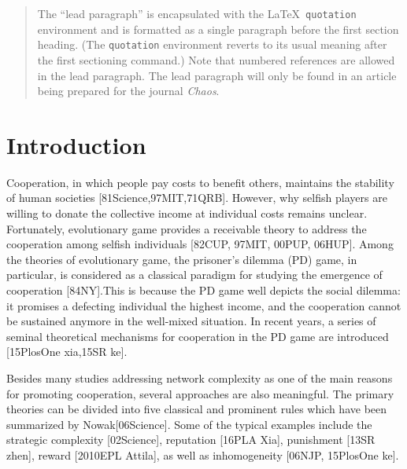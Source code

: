 \documentclass[%
 aip,
 amsmath,amssymb,
 reprint,%
]{revtex4-1}
\begin{document}
\maketitle

\begin{quotation}
The ``lead paragraph'' is encapsulated with the \LaTeX\
\verb+quotation+ environment and is formatted as a single paragraph before the first section heading.
(The \verb+quotation+ environment reverts to its usual meaning after the first sectioning command.)
Note that numbered references are allowed in the lead paragraph.
%
The lead paragraph will only be found in an article being prepared for the journal \textit{Chaos}.
\end{quotation}

\section{\label{sec:level1}Introduction}

Cooperation, in which people pay costs to benefit others, maintains the stability of human societies \cite{Trivers1971The} [81Science,97MIT,71QRB]. However, why selfish players are willing to donate the collective income at individual costs remains unclear. Fortunately, evolutionary game provides a receivable theory to address the cooperation among selfish individuals [82CUP, 97MIT, 00PUP, 06HUP]. Among the theories of evolutionary game, the prisoner's dilemma (PD) game, in particular, is considered as a classical paradigm for studying the emergence of cooperation [84NY].This is because the PD game well depicts the social dilemma: it promises a defecting individual the highest income, and the cooperation cannot be sustained anymore in the well-mixed situation. In recent years, a series of seminal theoretical mechanisms for cooperation in the PD game are introduced [15PlosOne xia,15SR ke].

Besides many studies addressing network complexity as one of the main reasons for promoting cooperation, several approaches are also meaningful. The primary theories can be divided into five classical and prominent rules which have been summarized by Nowak[06Science]. Some of the typical examples include the strategic complexity [02Science], reputation [16PLA Xia], punishment [13SR zhen], reward [2010EPL Attila], as well as inhomogeneity [06NJP, 15PlosOne ke].
\end{document}
